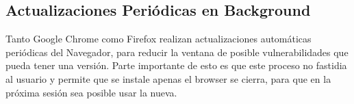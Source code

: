 



 \subsection{Actualizaciones Periódicas en Background}
 Tanto Google Chrome \cite{reis2009browser} como Firefox realizan actualizaciones automáticas periódicas del Navegador, para reducir la ventana de posible vulnerabilidades que pueda tener una versión. Parte importante de esto es que este proceso no fastidia al usuario y permite que se instale apenas el browser se cierra, para que en la próxima sesión sea posible usar la nueva.

